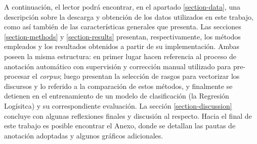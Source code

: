 A continuación, el lector podrá encontrar, en el apartado \ref{section-data},
una descripción sobre la descarga y obtención de los datos utilizados en este
trabajo, como así también de las características generales que presenta. Las
secciones \ref{section-methods} y \ref{section-results} presentan, respectivamente,
los métodos empleados y los resultados obtenidos a partir de su implementación.
Ambas poseen la misma estructura: en primer lugar hacen referencia
al proceso de anotación automático con supervisión y corrección manual utilizado
para pre-procesar el \textit{corpus}; luego presentan la selección de rasgos
para vectorizar los discursos y lo referido a la comparación de estos métodos, y
finalmente se detienen en el entrenamiento de un modelo de clasificación (la
Regresión Logísitca) y su correspondiente evaluación. La sección
\ref{section-discussion} concluye con algunas reflexiones finales y
discusión al respecto. Hacia el final de este trabajo es posible encontrar el
Anexo, donde se detallan las pautas de anotación adoptadas y algunos gráficos
adicionales.
